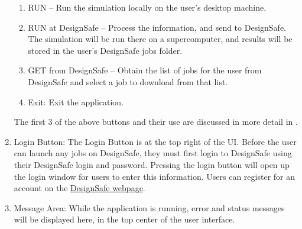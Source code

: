 \begin{enumerate}
\begin{enumerate}
\item RUN – Run the simulation locally on the user’s desktop machine.
\item RUN at DesignSafe – Process the information, and send to
  DesignSafe. The simulation will be run there on a supercomputer, and results
  will be stored in the user's DesignSafe jobs folder.
\item GET from DesignSafe – Obtain the list of
  jobs for the user from DesignSafe and select a job to download from that list.
\item Exit: Exit the application.
\end{enumerate}

The first 3 of the above buttons and their use are discussed in more detail in .

\item Login Button: The Login Button is at the top right of the UI. Before the user can launch any jobs on DesignSafe, they must
  first login to DesignSafe using their DesignSafe login and
  password. Pressing the login button will open up the login window
  for users to enter this information. Users can register for an
  account on
  the \href{https://www.designsafe-ci.org/account/register/}{DesignSafe
  webpage}.

\item Message Area: While the application is running, error and status messages will be displayed here, in the top center of the user interface.

\end{enumerate}
